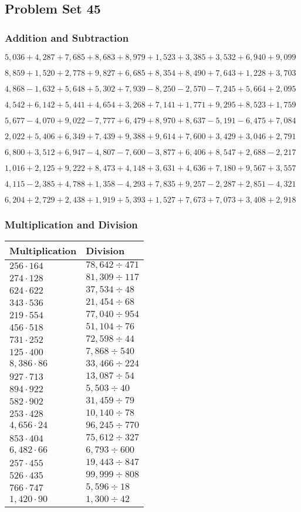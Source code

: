 \hypertarget{problem-set-45-2}{%
\subsection{Problem Set 45}\label{problem-set-45-2}}

\hypertarget{addition-and-subtraction-207}{%
\subsubsection{Addition and
Subtraction}\label{addition-and-subtraction-207}}

\(5,036+4,287+7,685+8,683+8,979+1,523+3,385+3,532+6,940+ 9,099\)

\(8,859+1,520+2,778+9,827+6,685+8,354+8,490+7,643+1,228+3,703\)

\(4,868-1,632+5,648+5,302+7,939-8,250-2,570-7,245+5,664+2,095\)

\(4,542+6,142+5,441+4,654+3,268+7,141+1,771+9,295+8,523+1,759\)

\(5,677-4,070+9,022-7,777+6,479+8,970+8,637-5,191-6,475+7,084\)

\(2,022+5,406+6,349+7,439+9,388+9,614+7,600+3,429+3,046+2,791\)

\(6,800+3,512+6,947-4,807-7,600-3,877+6,406+8,547+2,688-2,217\)

\(1,016+2,125+9,222+8,473+4,148+3,631+4,636+7,180+9,567+3,557\)

\(4,115-2,385+4,788+1,358-4,293+7,835+9,257-2,287+2,851-4,321\)

\(6,204+2,729+2,438+1,919+5,393+1,527+7,673+7,073+3,408+2,918\)

\hypertarget{multiplication-and-division-206}{%
\subsubsection{Multiplication and
Division}\label{multiplication-and-division-206}}

\begin{longtable}[]{@{}ll@{}}
\toprule
Multiplication & Division\tabularnewline
\midrule
\endhead
\(256\cdot164\) & \(78,642÷471\)\tabularnewline
\(274\cdot128\) & \(81,309÷117\)\tabularnewline
\(624\cdot622\) & \(37,534÷48\)\tabularnewline
\(343\cdot536\) & \(21,454÷68\)\tabularnewline
\(219\cdot554\) & \(77,040÷954\)\tabularnewline
\(456\cdot518\) & \(51,104÷76\)\tabularnewline
\(731\cdot252\) & \(72,598÷44\)\tabularnewline
\(125\cdot400\) & \(7,868÷540\)\tabularnewline
\(8,386\cdot86\) & \(33,466÷224\)\tabularnewline
\(927\cdot713\) & \(13,087÷54\)\tabularnewline
\(894\cdot922\) & \(5,503÷40\)\tabularnewline
\(582\cdot902\) & \(31,459÷79\)\tabularnewline
\(253\cdot428\) & \(10,140÷78\)\tabularnewline
\(4,656\cdot24\) & \(96,245÷770\)\tabularnewline
\(853\cdot404\) & \(75,612÷327\)\tabularnewline
\(6,482\cdot66\) & \(6,793÷600\)\tabularnewline
\(257\cdot455\) & \(19,443÷847\)\tabularnewline
\(526\cdot435\) & \(99,999÷808\)\tabularnewline
\(766\cdot747\) & \(5,596÷18\)\tabularnewline
\(1,420\cdot90\) & \(1,300÷42\)\tabularnewline
\bottomrule
\end{longtable}

